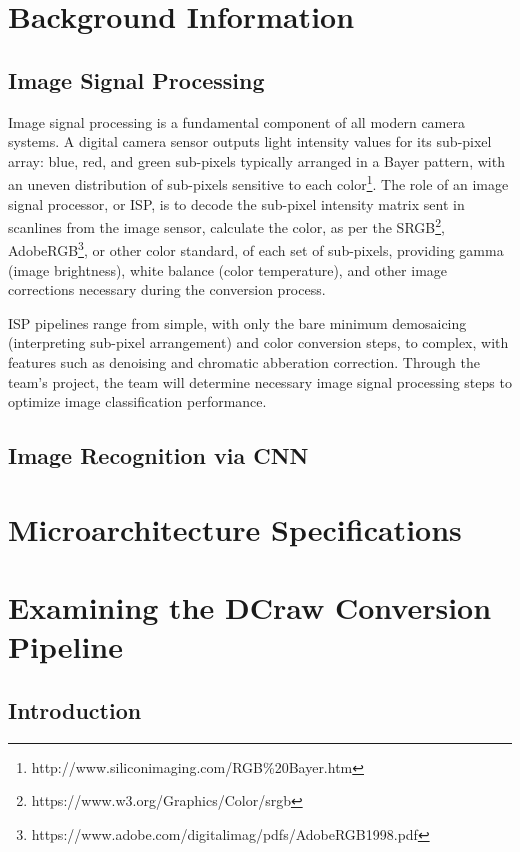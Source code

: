 \documentclass{report}
\begin{document}
\chapter{Background Information}
	\section{Image Signal Processing}
	Image signal processing is a fundamental component of all modern camera systems. A digital camera sensor outputs light intensity values for its sub-pixel array: blue, red, and green sub-pixels typically arranged in a Bayer pattern, with an uneven distribution of sub-pixels sensitive to each color\footnote{http://www.siliconimaging.com/RGB\%20Bayer.htm}. The role of an image signal processor, or ISP, is to decode the sub-pixel intensity matrix sent in scanlines from the image sensor, calculate the color, as per the SRGB\footnote{https://www.w3.org/Graphics/Color/srgb}, AdobeRGB\footnote{https://www.adobe.com/digitalimag/pdfs/AdobeRGB1998.pdf}, or other color standard, of each set of sub-pixels, providing gamma (image brightness), white balance (color temperature), and other image corrections necessary during the conversion process.
	
	ISP pipelines range from simple, with only the bare minimum demosaicing (interpreting sub-pixel arrangement) and color conversion steps, to complex, with features such as denoising and chromatic abberation correction. Through the team's project, the team will determine necessary image signal processing steps to optimize image classification performance.
		
	\section{Image Recognition via CNN}
	
\chapter{Microarchitecture Specifications}


\chapter{Examining the DCraw Conversion Pipeline}
\section{Introduction}
\end{document}
